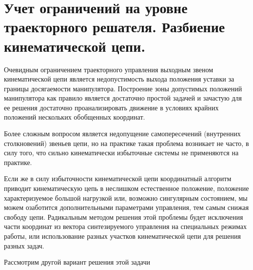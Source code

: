 \section{Учет ограничений на уровне траекторного решателя. Разбиение кинематической цепи.}\label{restr_traj}

Очевидным ограничением траекторного управления выходным звеном кинематической цепи является недопустимость выхода положения уставки за границы досягаемости манипулятора. Построение зоны допустимых положений манипулятора как правило является достаточно простой задачей и зачастую для ее решения достаточно проанализировать движение в условиях крайних положений нескольких обобщенных координат.

Более сложным вопросом является недопущение самопересечений (внутренних столкновений) звеньев цепи, но на практике такая проблема возникает не часто, в силу того, что сильно кинематически избыточные системы не применяются на практике.

Если же в силу избыточности кинематической цепи координатный алгоритм приводит кинематическую цепь в неслишком естественное положение, положение характеризуемое большой нагрузкой или, возможно сингулярным состоянием, мы можем озаботится дополнительными параметрами управления, тем самым снижая свободу цепи. Радикальным методом решения этой проблемы будет исключения части координат из вектора синтезируемого управления на специальных режимах работы, или использование разных участков кинематической цепи для решения разных задач. 

Рассмотрим другой вариант решения этой задачи
